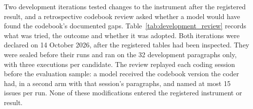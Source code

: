 Two development iterations tested changes to the instrument after the registered result, and a retrospective codebook review asked whether a model would have found the codebook's documented gaps. Table~\ref{tab:development_review} records what was tried, the outcome and whether it was adopted. Both iterations were declared on 14 October 2026, after the registered tables had been inspected. They were sealed before their runs and ran on the 32 development paragraphs only, with three executions per candidate. The review replayed each coding session before the evaluation sample: a model received the codebook version the coder had, in a second arm with that session's paragraphs, and named at most 15 issues per run. None of these modifications entered the registered instrument or result.

\appneedspace{0.15\textheight}
\begingroup\scriptsize
\setlength{\tabcolsep}{4pt}
